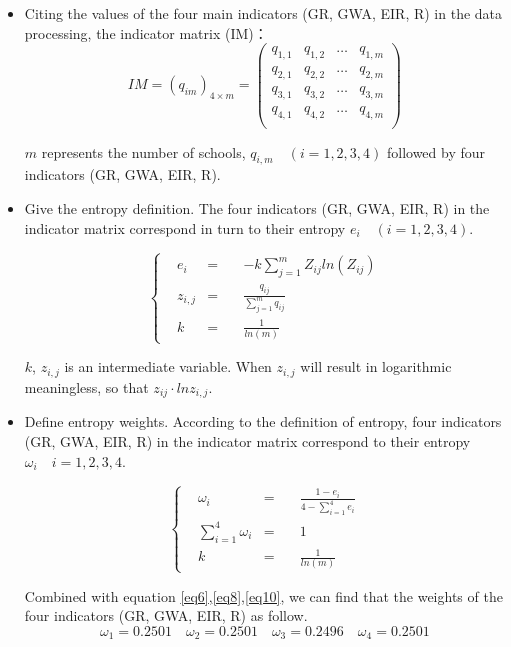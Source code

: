 \documentclass{mcmthesis}
\begin{document}
\begin{itemize}
	\item Citing the values of the four main indicators (GR, GWA, EIR, R) in the data processing, the indicator matrix (IM)：
		\begin{equation}
		\label{eq6}
		IM=(q_{im})_{4\times m}=\left(\begin{array}{cccc}
		q_{1,1} & q_{1,2} & \ldots & q_{1,m}\\
		q_{2,1} & q_{2,2} & \ldots & q_{2,m}\\
		q_{3,1} & q_{3,2} & \ldots & q_{3,m}\\
		q_{4,1} & q_{4,2} & \ldots & q_{4,m}\\
		\end{array} \right)
		\end{equation}
		
		$m$ represents the number of schools,  $q_{i,m} \quad (i = 1,2,3,4)$ followed by four indicators (GR, GWA, EIR, R).
	\item Give the entropy definition. The four indicators (GR, GWA, EIR, R) in the indicator matrix correspond in turn to their entropy $e_i \quad (i=1,2,3,4)$.
 
	
		\begin{equation}
		\label{eq8}
		\left\{
			\begin{aligned}
				&e_i & = \quad & -k\sum^m_{j=1}Z_{ij}ln(Z_{ij}) \\
				&z_{i,j} & = \quad & \frac{q_{ij}}{\sum\limits ^m_{j=1}q_{ij}} \\
				&k & = \quad & \frac {1}{ln(m)}
			\end{aligned}
		\right.
	\end{equation}

	$k$, $z_{i,j}$ is an intermediate variable. When $z_{i,j}$ will result in logarithmic meaningless, so that $z_{ij}\cdot ln z_{i,j}$.
	\item Define entropy weights. According to the definition of entropy, four indicators (GR, GWA, EIR, R) in the indicator matrix correspond to their entropy $\omega_i \quad i = 1,2,3,4$.

		\begin{equation}
			\label{eq10}
			\left\{
			\begin{split}
				&\omega_i & = \quad & \frac{1-e_i}{4-\sum\limits^4_{i=1}e_i} \\
				&\sum^4_{i=1}\omega_i & = \quad & 1 \\
				&k & = \quad & \frac {1}{ln(m)}
			\end{split}
			\right.
		\end{equation}

		Combined with equation \ref{eq6},\ref{eq8},\ref{eq10}, we can find that the weights of the four indicators (GR, GWA, EIR, R) as follow.
		\begin{equation}
			\label{eq11}
			\omega_1=0.2501 \quad \omega_2=0.2501 \quad \omega_3=0.2496 \quad \omega_4=0.2501
		\end{equation}
	
\end{itemize}
\end{document}
